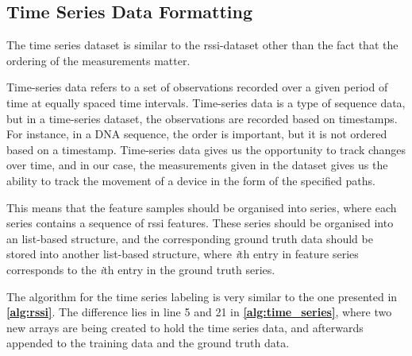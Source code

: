 
\subsection{Time Series Data Formatting}

The time series dataset is similar to the \gls{rssi}-dataset other than the fact that the ordering of the measurements matter. 

Time-series data refers to a set of observations recorded over a given period of time at equally spaced time intervals. Time-series data is a type of sequence data, but in a time-series dataset, the observations are recorded based on timestamps. For instance, in a DNA sequence, the order is important, but it is not ordered based on a timestamp\cite{Yalcın2021}. Time-series data gives us the opportunity to track changes over time, and in our case, the measurements given in the dataset gives us the ability to track the movement of a device in the form of the specified paths. 

This means that the feature samples should be organised into series, where each series contains a sequence of \gls{rssi} features. These series should be organised into an list-based structure, and the corresponding ground truth data should be stored into another list-based structure, where \textit{i}th entry in feature series corresponds to the \textit{i}th entry in the ground truth series.

The algorithm for the time series labeling is very similar to the one presented in \textbf{\autoref{alg:rssi}}. The difference lies in line 5 and 21 in \textbf{\autoref{alg:time_series}}, where two new arrays are being created to hold the time series data, and afterwards appended to the training data and the ground truth data.

